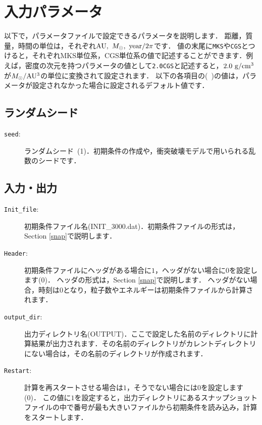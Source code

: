 \documentclass[12pt,a4paper,dvipdfmx]{jsarticle}
\begin{document}
  
\section{入力パラメータ\label{parameter}}

以下で，パラメータファイルで設定できるパラメータを説明します．
距離，質量，時間の単位は，それぞれ${\rm AU},\ M_{\odot},\ {\rm year}/2\pi$です．
値の末尾に\texttt{MKS}や\texttt{CGS}とつけると，それぞれMKS単位系，CGS単位系の値で記述することができます．例えば，密度の次元を持つパラメータの値として\texttt{2.0CGS}と記述すると，$2.0\ {\rm g/cm^{3}}$が$M_{\odot}/{\rm AU^{3}}$の単位に変換されて設定されます．
以下の各項目の(\ )の値は，パラメータが設定されなかった場合に設定されるデフォルト値です．

\subsection{ランダムシード}
\begin{description}
\item[\texttt{seed}:]
ランダムシード\ (1)．初期条件の作成や，衝突破壊モデルで用いられる乱数のシードです．
\end{description}

\subsection{入力・出力}
\begin{description}
\item[\texttt{Init\_file}:]
初期条件ファイル名(INIT\_3000.dat)．初期条件ファイルの形式は，Section \ref{snap}で説明します．
\item[\texttt{Header}:]
初期条件ファイルにヘッダがある場合に$1$，ヘッダがない場合に$0$を設定します(0)．
ヘッダの形式は，Section \ref{snap}で説明します．
ヘッダがない場合，時刻は$0$となり，粒子数やエネルギーは初期条件ファイルから計算されます．
\item[\texttt{output\_dir}:]
出力ディレクトリ名(OUTPUT)．ここで設定した名前のディレクトリに計算結果が出力されます．その名前のディレクトリがカレントディレクトリにない場合は，その名前のディレクトリが作成されます．
\item[\texttt{Restart}:]
計算を再スタートさせる場合は$1$，そうでない場合には$0$を設定します(0)．
この値に$1$を設定すると，出力ディレクトリにあるスナップショットファイルの中で番号が最も大きいファイルから初期条件を読み込み，計算をスタートします．

\end{description}
\end{document}
